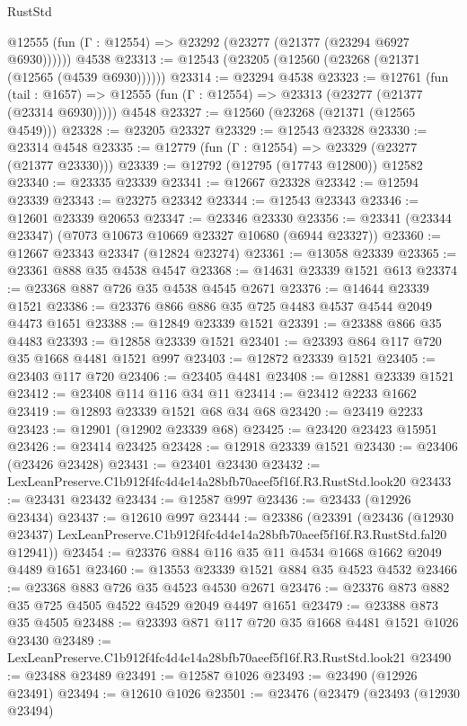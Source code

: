 \begin{lexlean}{RustStd}
\begin{coremodule}
      @12555 (fun (Γ : @12554) => @23292 (@23277 (@21377 (@23294 @6927 @6930))))))
    @4538
@23313 := @12543 (@23205 (@12560 (@23268 (@21371 (@12565 (@4539 @6930))))))
@23314 := @23294 @4538
@23323 := @12761
    (fun (tail : @1657) => @12555 (fun (Γ : @12554) => @23313 (@23277 (@21377 (@23314 @6930)))))
    @4548
@23327 := @12560 (@23268 (@21371 (@12565 @4549)))
@23328 := @23205 @23327
@23329 := @12543 @23328
@23330 := @23314 @4548
@23335 := @12779 (fun (Γ : @12554) => @23329 (@23277 (@21377 @23330)))
@23339 := @12792 (@12795 (@17743 @12800)) @12582
@23340 := @23335 @23339
@23341 := @12667 @23328
@23342 := @12594 @23339
@23343 := @23275 @23342
@23344 := @12543 @23343
@23346 := @12601 @23339 @20653
@23347 := @23346 @23330
@23356 := @23341 (@23344 @23347) (@7073 @10673 @10669 @23327 @10680 (@6944 @23327))
@23360 := @12667 @23343 @23347 (@12824 @23274)
@23361 := @13058 @23339
@23365 := @23361 @888 @35 @4538 @4547
@23368 := @14631 @23339 @1521 @613
@23374 := @23368 @887 @726 @35 @4538 @4545 @2671
@23376 := @14644 @23339 @1521
@23386 := @23376 @866 @886 @35 @725 @4483 @4537 @4544 @2049 @4473 @1651
@23388 := @12849 @23339 @1521
@23391 := @23388 @866 @35 @4483
@23393 := @12858 @23339 @1521
@23401 := @23393 @864 @117 @720 @35 @1668 @4481 @1521 @997
@23403 := @12872 @23339 @1521
@23405 := @23403 @117 @720
@23406 := @23405 @4481
@23408 := @12881 @23339 @1521
@23412 := @23408 @114 @116 @34 @11
@23414 := @23412 @2233 @1662
@23419 := @12893 @23339 @1521 @68 @34 @68
@23420 := @23419 @2233
@23423 := @12901 (@12902 @23339 @68)
@23425 := @23420 @23423 @15951
@23426 := @23414 @23425
@23428 := @12918 @23339 @1521
@23430 := @23406 (@23426 @23428)
@23431 := @23401 @23430
@23432 := LexLeanPreserve.C1b912f4fc4d4e14a28bfb70aeef5f16f.R3.RustStd.look20
@23433 := @23431 @23432
@23434 := @12587 @997
@23436 := @23433 (@12926 @23434)
@23437 := @12610 @997
@23444 := @23386
    (@23391
      (@23436
        (@12930 @23437)
        LexLeanPreserve.C1b912f4fc4d4e14a28bfb70aeef5f16f.R3.RustStd.fal20
        @12941))
@23454 := @23376 @884 @116 @35 @11 @4534 @1668 @1662 @2049 @4489 @1651
@23460 := @13553 @23339 @1521 @884 @35 @4523 @4532
@23466 := @23368 @883 @726 @35 @4523 @4530 @2671
@23476 := @23376 @873 @882 @35 @725 @4505 @4522 @4529 @2049 @4497 @1651
@23479 := @23388 @873 @35 @4505
@23488 := @23393 @871 @117 @720 @35 @1668 @4481 @1521 @1026 @23430
@23489 := LexLeanPreserve.C1b912f4fc4d4e14a28bfb70aeef5f16f.R3.RustStd.look21
@23490 := @23488 @23489
@23491 := @12587 @1026
@23493 := @23490 (@12926 @23491)
@23494 := @12610 @1026
@23501 := @23476
    (@23479
      (@23493
        (@12930 @23494)

\end{coremodule}
\end{lexlean}
